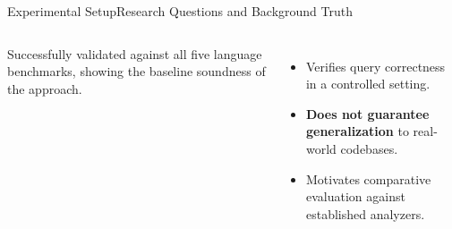 \documentclass[aspectratio=169,10pt]{beamer}
\begin{document}
\begin{frame}{Experimental Setup}{Research Questions and Background Truth}
\begin{columns}[T,onlytextwidth]
      \begin{cookiecard}[title={RQ1 Results:}]
        {\footnotesize Successfully validated against all five language benchmarks, showing the baseline soundness of the approach.\par}
      \end{cookiecard}
      \vspace{0.7em}

      \par\vspace{0.15em}
      \begin{itemize}
        \footnotesize
        \item Verifies query correctness in a controlled setting.\par\vspace{0.15em}
        \item \textbf{Does not guarantee generalization} to real-world codebases.\par\vspace{0.15em}
        \item Motivates comparative evaluation against established analyzers.\par
      \end{itemize}
  \end{columns}
\end{frame}
\end{document}
